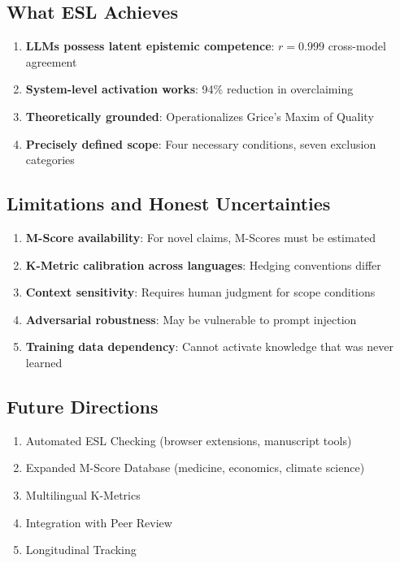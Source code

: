 \subsection{What ESL Achieves}

\begin{enumerate}
    \item \textbf{LLMs possess latent epistemic competence}: $r = 0.999$ cross-model agreement
    \item \textbf{System-level activation works}: 94\% reduction in overclaiming
    \item \textbf{Theoretically grounded}: Operationalizes Grice's Maxim of Quality
    \item \textbf{Precisely defined scope}: Four necessary conditions, seven exclusion categories
\end{enumerate}


\subsection{Limitations and Honest Uncertainties}

\begin{enumerate}
    \item \textbf{M-Score availability}: For novel claims, M-Scores must be estimated
    \item \textbf{K-Metric calibration across languages}: Hedging conventions differ
    \item \textbf{Context sensitivity}: Requires human judgment for scope conditions
    \item \textbf{Adversarial robustness}: May be vulnerable to prompt injection
    \item \textbf{Training data dependency}: Cannot activate knowledge that was never learned
\end{enumerate}


\subsection{Future Directions}

\begin{enumerate}
    \item Automated ESL Checking (browser extensions, manuscript tools)
    \item Expanded M-Score Database (medicine, economics, climate science)
    \item Multilingual K-Metrics
    \item Integration with Peer Review
    \item Longitudinal Tracking
\end{enumerate}



